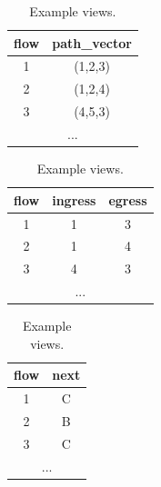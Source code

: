 \begin{table}[ht!]
  \centering
\begin{subtable}[t]{0.3\linewidth}
    \centering
  {\footnotesize
      \begin{tabular}[t]{c|c}
        flow & path\_vector \\
        \hline
        1 & (1,2,3) \\
        2 & (1,2,4) \\
        3 & (4,5,3) \\
        \multicolumn{2}{c}{...}
        \label{tb:routing} 
    \end{tabular}
    }
  \end{subtable}
  \;
  \begin{subtable}[t]{0.33\linewidth}
    \centering
  {\footnotesize
    \begin{tabular}[t]{c|c|c}
      flow & ingress & egress \\
      \hline
      1 & 1 & 3 \\
      2 & 1 & 4 \\
      3 & 4 & 3 \\
      \multicolumn{3}{c}{...}
      \label{tb:endpoint}
    \end{tabular}
    }
  \end{subtable}
  \;
  \begin{subtable}[t]{0.3\linewidth}
    \centering
  {\footnotesize
    \begin{tabular}[t]{c|c}
        flow & next \\
        \hline
        1 &  C  \\
        2 & B \\
        3 & C \\
        \multicolumn{2}{c}{...}
        \label{tb:rule-capacity}
      \end{tabular}
    }
  \end{subtable}        
  \caption{\footnotesize Example views.}
\label{table:eg-views}
\end{table}

